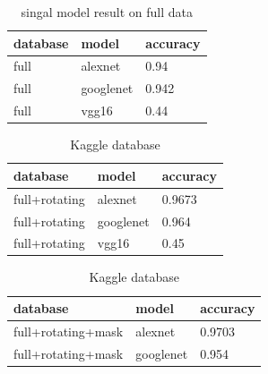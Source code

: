 \documentclass[conference]{IEEEtran}
\begin{document}
\begin{table}[t]
  \caption{singal model result on full data}
  \label{table:table2}
  \centering
  \begin{tabular}{lll}
    \toprule
    \cmidrule{1-3}
    database     &model       &accuracy \\
    \midrule
    full & alexnet     & 0.94 \\
    full & googlenet    &0.942 \\
    full  & vgg16    & 0.44 \\
    \bottomrule
  \end{tabular}
\end{table}


\begin{table}[t]
\small
\centering
\caption{Kaggle database}
\label{table:table3}
\begin{tabular}{lll}
    \toprule
    \cmidrule{1-3}
     database     &model      &accuracy \\
	\midrule
       full+rotating & alexnet     & 0.9673  \\
       full+rotating & googlenet   &0.964    \\
       full+rotating  & vgg16  & 0.45  \\
       \bottomrule
\end{tabular}
\end{table}

\begin{table}[t]
\small
\centering
\caption{Kaggle database}
\label{table:table4}
\begin{tabular}{lll}
    \toprule
    \cmidrule{1-3}
     database     &model        &accuracy \\
	\midrule
       full+rotating+mask & alexnet     & 0.9703  \\
       full+rotating+mask & googlenet   &0.954    \\
  
       \bottomrule
\end{tabular}
\end{table}
\end{document}
